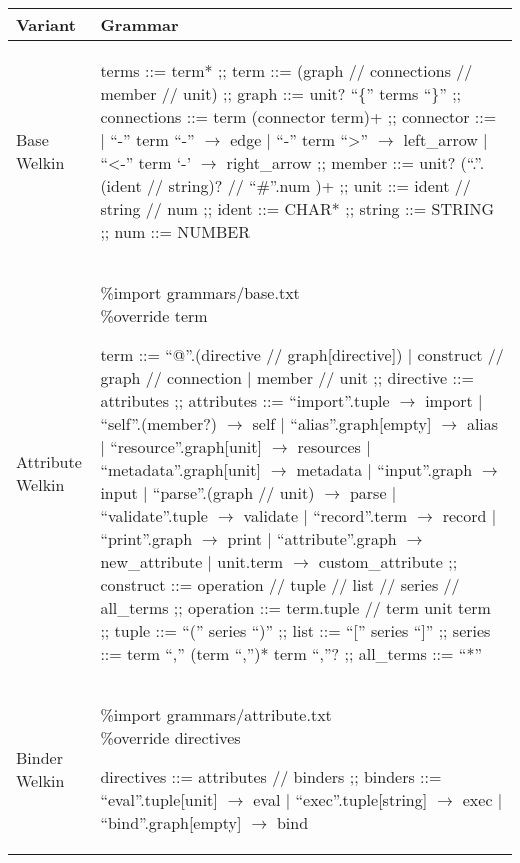 
\begin{table}[hbt!]
  \centering
    \begin{tabular}{| p{1.5cm} | p{9.5cm} |}%
    \hline
    Variant & Grammar \\\hline %
      \makecell{Base \\ Welkin} &
  \begin{bnf}
  terms ::= term* ;;
  term ::= (graph // connections // member // unit) ;;
  graph ::= unit? ``\{'' terms ``\}'' ;;
  connections ::= term (connector term)+ ;;
	connector ::=
   | ``-'' term ``-'' $\to$ edge
   | ``-'' term ``>'' $\to$ left\_arrow
	 | ``<-'' term `-' $\to$ right\_arrow ;;
  member ::= unit? (``.''.(ident // string)? // ``\#''.num )+ ;;
	unit ::= ident // string // num ;;
  ident ::= CHAR* ;;
	string ::= STRING ;;
	num ::= NUMBER
\end{bnf} \\ %
   \hline
      Attribute Welkin &
  \makecell{\%import grammars/base.txt \\ \%override term}
  \begin{bnf}
  term ::= ``@''.(directive // graph[directive]) | construct // graph // connection | member // unit ;;
  directive ::= attributes ;;
  attributes ::= ``import''.tuple $\to$ import
  | ``self''.(member?) $\to$ self
  | ``alias''.graph[empty] $\to$ alias
  | ``resource''.graph[unit] $\to$ resources
  | ``metadata''.graph[unit] $\to$ metadata
  | ``input''.graph $\to$ input
  | ``parse''.(graph // unit) $\to$ parse
  | ``validate''.tuple $\to$ validate
  | ``record''.term $\to$ record
  | ``print''.graph $\to$ print
  | ``attribute''.graph $\to$ new\_attribute
  | unit.term $\to$ custom\_attribute ;;
  construct ::= operation // tuple // list // series // all\_terms ;;
  operation ::= term.tuple // term unit term ;;
  tuple ::= ``('' series ``)'' ;;
  list ::= ``['' series ``]'' ;;
  series ::= term ``,'' (term ``,'')* term ``,''? ;;
  all\_terms ::= ``*''
 \end{bnf} \\
   \hline
   Binder Welkin &
\makecell{\%import grammars/attribute.txt \\ \%override directives}
    \begin{bnf}
     directives ::= attributes // binders ;;
     binders ::= ``eval''.tuple[unit] $\to$ eval
     | ``exec''.tuple[string] $\to$ exec
     | ``bind''.graph[empty] $\to$ bind
   \end{bnf} \\
    \hline
    \end{tabular}
  \end{table}


